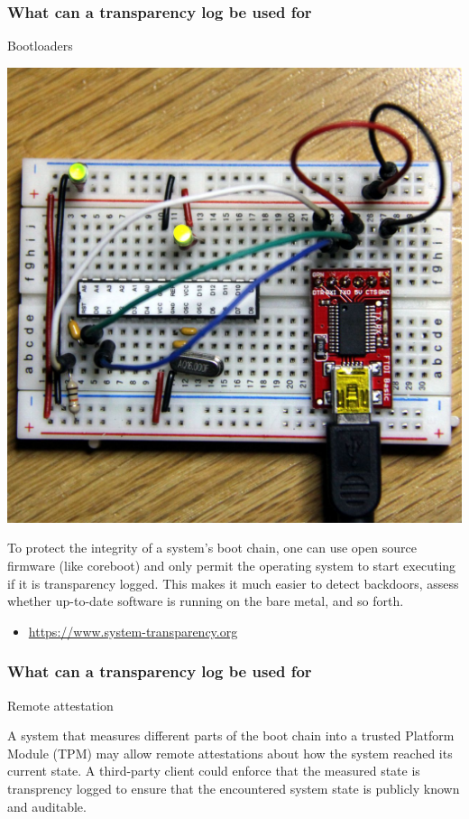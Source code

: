 \begin{frame}
  \frametitle{What can a transparency log be used for}

  \centerline{Bootloaders}

  \centerline{\includegraphics[scale=.1]{img/bootloader}}
  \pause

  To protect the integrity of a system's boot chain, one can use open
  source firmware (like coreboot) and only permit the operating system
  to start executing if it is transparency logged. This makes it much
  easier to detect backdoors, assess whether up-to-date software is
  running on the bare metal, and so forth.

  \begin{itemize}
  \item \url{https://www.system-transparency.org}
  \end{itemize}
\end{frame}

\begin{frame}
  \frametitle{What can a transparency log be used for}

  Remote attestation
  \pause

  A system that measures different parts of the boot chain into a
  trusted Platform Module (TPM) may allow remote attestations about
  how the system reached its current state. A third-party client
  could enforce that the measured state is transprency logged to
  ensure that the encountered system state is publicly known and
  auditable.
\end{frame}

